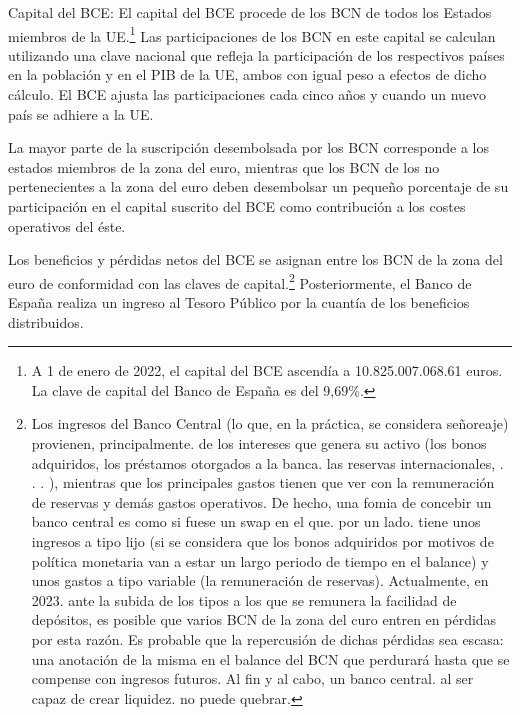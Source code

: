 \documentclass[10pt,a4paper]{article}
\begin{document}
{Capital del BCE: El capital del BCE procede de los BCN de todos los Estados miembros de la UE.\footnote{%
    A 1 de enero de 2022, el capital del BCE ascendía a 10.825.007.068.61 euros. La clave de capital del Banco de España es del 9,69\%.
} Las participaciones de los BCN en este capital se calculan utilizando una clave nacional que refleja la participación de los respectivos países en la población y en el PIB de la UE, ambos con igual peso a efectos de dicho cálculo. El BCE ajusta las participaciones cada cinco años y cuando un nuevo país se adhiere a la UE.

La mayor parte de la suscripción desembolsada por los BCN corresponde a los estados miembros de la zona del euro, mientras que los BCN de los no pertenecientes a la zona del euro deben desembolsar un pequeño porcentaje de su participación en el capital suscrito del BCE como contribución a los costes operativos del éste. 

Los beneficios y pérdidas netos del BCE se asignan entre los BCN de la zona del euro de conformidad con las claves de capital.\footnote{%
    Los ingresos del Banco Central (lo que, en la práctica, se considera señoreaje) provienen, principalmente. de los intereses que genera su activo (los bonos adquiridos, los préstamos otorgados a la banca. las reservas internacionales, . . . ), mientras que los principales gastos tienen que ver con la remuneración de reservas y demás gastos operativos. De hecho, una fomia de concebir un banco central es como si fuese un swap en el que. por un lado. tiene unos ingresos a tipo lijo (si se considera que los bonos adquiridos por motivos de política monetaria van a estar un largo periodo de tiempo en el balance) y unos gastos a tipo variable (la remuneración de reservas). Actualmente, en 2023. ante la subida de los tipos a los que se remunera la facilidad de depósitos, es posible que varios BCN de la zona del curo entren en pérdidas por esta razón. Es probable que la repercusión de dichas pérdidas sea escasa: una anotación de la misma en el balance del BCN que perdurará hasta que se compense con ingresos futuros. Al fin y al cabo, un banco central. al ser capaz de crear liquidez. no puede quebrar.
} Posteriormente, el Banco de España realiza un ingreso al Tesoro Público por la cuantía de los beneficios distribuidos.  





}
\end{document}
